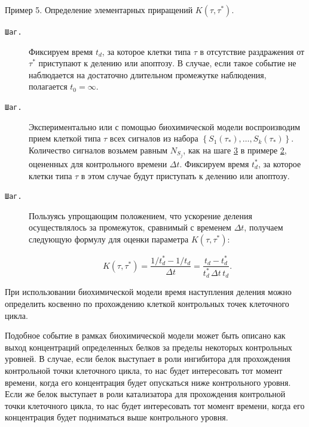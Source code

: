 \smallskip  

 

{\small\sc Пример 5.} Определение  элементарных	приращений $K(\tau,\tau^{*})$.

 

\smallskip  

\begin{description}





\item[\tt Шаг.\!\!]  Фиксируем время $t_{d}$, за которое клетки типа $\tau$ в отсутствие раздражения от $\tau^{*}$ приступают к делению или апоптозу. В случае, если такое событие не наблюдается на достаточно длительном промежутке наблюдения, полагается $t_{0} = \infty$.



\item[\tt Шаг.\!\!]   Экспериментально или с помощью биохимической модели воспроизводим прием клеткой  типа $\tau$ всех сигналов из набора $\left\lbrace  S_{1}(\tau_{*}), \dots , S_{k}(\tau_{*}) \right\rbrace $. Количество сигналов возьмем равным $N_{S_{j}}$, как на шаге \hyperlink{naz:st:2.3}{3}  в примере \hyperlink{naz:ex:2}{2}, оцененных для контрольного времени $\Delta t$. Фиксируем время $t^{*}_{d}$, за которое клетки  типа $\tau$  в этом случае будут приступать к делению или апоптозу. 



\item[\tt Шаг.\!\!]    Пользуясь упрощающим положением, что ускорение  деления осуществлялось за промежуток, сравнимый с временем $\Delta t$, получаем следующую формулу для оценки параметра $K(\tau, \tau^{*})$:



\[

	K(\tau, \tau^{*}) = \dfrac{1/t^{*}_{d}-1/t_{d}}{\Delta t} =   \dfrac{t_{d} - t^{*}_{d}}{t^{*}_{d}\,  \Delta t \, t_{d}}.

\]



 

\end{description}



При использовании биохимической модели время наступления деления можно определить косвенно по прохождению клеткой контрольных точек клеточного цикла. 

Подобное событие в рамках биохимической модели может быть описано как выход концентраций определенных белков за пределы некоторых контрольных уровней. В случае, если белок выступает в роли ингибитора для прохождения контрольной точки клеточного цикла, то нас будет интересовать тот момент времени, когда его концентрация будет опускаться ниже контрольного уровня. Если же белок выступает в роли катализатора для прохождения контрольной точки клеточного цикла, то нас будет интересовать тот момент времени, когда его концентрация будет подниматься выше контрольного уровня.





